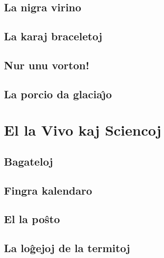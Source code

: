 \documentclass[a5paper,11pt,openany,twoside]{book}
\begin{document}
\newpage %

\section{La nigra virino}
\label{nigra}


\section{La karaj braceletoj}
\label{braceletoj}


\section{Nur unu vorton!}
\label{unuvorton}


\section{La porcio da glacia\^{\j}o}
\label{porcio}


%
%
\chapter{El la Vivo kaj Sciencoj}
\section{Bagateloj}
\label{bagateloj}


\section{Fingra kalendaro}
\label{fingra}


\section{El la po\^sto}
\label{posxto}


\section{La lo\^gejoj de la termitoj}
\label{termitoj}

\end{document}

